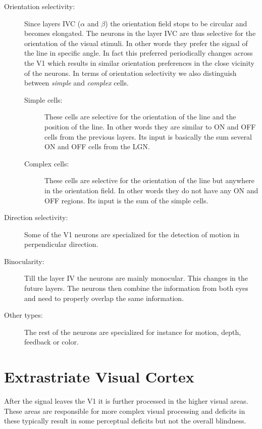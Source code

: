 \begin{description}
    \item[Orientation selectivity:] Since layers IVC ($\alpha$ and $\beta$) the  
    orientation field stops to be circular and becomes elongated. The neurons in the 
    layer IVC are thus selective for the orientation of the visual stimuli. In other
    words they prefer the signal of the line in specific angle. In fact this preferred
    periodically changes across the V1 which results in similar orientation preferences
    in the close vicinity of the neurons. In terms of orientation selectivity 
    we also distinguish between \emph{simple} and \emph{complex} cells.
    \begin{description}
        \item[Simple cells:] These cells are selective for the orientation of the line 
        and the position of the line. In other words they are similar to ON and OFF cells
        from the previous layers. Its input is basically the sum several ON and OFF cells 
        from the LGN. 
        \item[Complex cells:] These cells are selective for the orientation of the line
        but anywhere in the orientation field. In other words they do not have any 
        ON and OFF regions. Its input is the sum of the simple cells.
    \end{description} 

    \item[Direction selectivity:] Some of the V1 neurons are specialized for the detection
    of motion in perpendicular direction.
    \item[Binocularity:] Till the layer IV the neurons are mainly monocular. This
    changes in the future layers. The neurons then combine the information from both eyes 
    and need to properly overlap the same information.
    \item[Other types:] The rest of the neurons are specialized for instance for motion, 
    depth, feedback or color.
\end{description}

\section{Extrastriate Visual Cortex}
\label{sec:extrastriate}
After the signal leaves the V1 it is further processed in the higher visual areas.
These areas are responsible for more complex visual processing and deficits in these 
typically result in some perceptual deficits but not the overall blindness.

